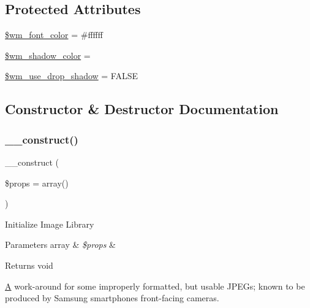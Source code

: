 \subsection*{Protected Attributes}
\begin{DoxyCompactItemize}
\item 
\mbox{\hyperlink{class_c_i___image__lib_ae9498442637ff2466d4426af45f68c6b}{\$wm\+\_\+font\+\_\+color}} = \textquotesingle{}\#ffffff\textquotesingle{}
\item 
\mbox{\hyperlink{class_c_i___image__lib_aca292b49514fe3238440675c4b2642ca}{\$wm\+\_\+shadow\+\_\+color}} = \textquotesingle{}\textquotesingle{}
\item 
\mbox{\hyperlink{class_c_i___image__lib_a49b77ed476cebe5f357705e7a9c4ccce}{\$wm\+\_\+use\+\_\+drop\+\_\+shadow}} = F\+A\+L\+SE
\end{DoxyCompactItemize}


\subsection{Constructor \& Destructor Documentation}
\mbox{\label{class_c_i___image__lib_a563262d396a1cef6153c9998d77bb548}} 
\subsubsection{\texorpdfstring{\+\_\+\+\_\+construct()}{\_\_construct()}}
{\footnotesize\ttfamily \+\_\+\+\_\+construct (\begin{DoxyParamCaption}\item[{}]{\$props = {\ttfamily array()} }\end{DoxyParamCaption})}

Initialize Image Library


\begin{DoxyParams}[1]{Parameters}
array & {\em \$props} & \\
\hline
\end{DoxyParams}
\begin{DoxyReturn}{Returns}
void 
\end{DoxyReturn}
\mbox{\hyperlink{class_a}{A}} work-\/around for some improperly formatted, but usable J\+P\+E\+Gs; known to be produced by Samsung smartphones\textquotesingle{} front-\/facing cameras.

